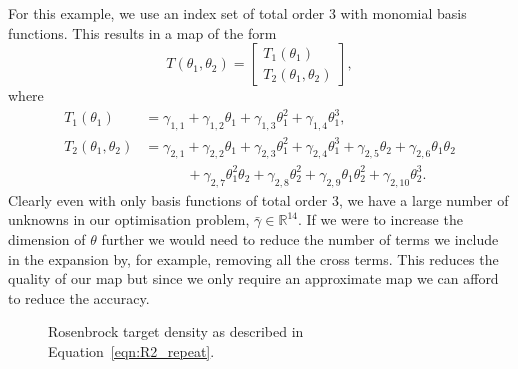 \documentclass[final]{siamltex}
\begin{document}
For this example, we use an index set of total order 3 with monomial basis functions. This results in a map of the form
\[
	T(\theta_1, \theta_2) = \begin{bmatrix} T_1(\theta_1) \\ T_2(\theta_1, \theta_2) \end{bmatrix},
\]
where
\begin{align*}
		T_1(\theta_1) &= \gamma_{1,1} + \gamma_{1,2}\theta_1 + \gamma_{1,3}\theta_1^2 + \gamma_{1,4}\theta_1^3, \\
		T_2(\theta_1, \theta_2) &= \gamma_{2,1} + \gamma_{2,2}\theta_1 + \gamma_{2,3}\theta_1^2 + \gamma_{2,4}\theta_1^3
					+ \gamma_{2,5}\theta_2 + \gamma_{2,6}\theta_1\theta_2 \\
				 & \qquad \quad + \gamma_{2,7}\theta_1^2\theta_2 + \gamma_{2,8}\theta_2^2 + \gamma_{2,9}\theta_1\theta_2^2 +
					 \gamma_{2,10}\theta_2^3.
\end{align*}
Clearly even with only basis functions of total order 3, we have a large number of unknowns in our optimisation problem, $\bar{\gamma} \in \mathbb{R}^{14}$. If we were to increase the dimension of $\theta$ further we would need to reduce the number of terms we include in the expansion by, for example, removing all the cross terms. This reduces the quality of our map but since we only require an approximate map we can afford to reduce the accuracy.

\begin{figure}[htpb]
\centering
{}\quad
{}\quad
{}
\caption{Rosenbrock target density as described in Equation~\eqref{eqn:R2_repeat}.}
\label{fig:R2_transport}
\end{figure}
\end{document}

